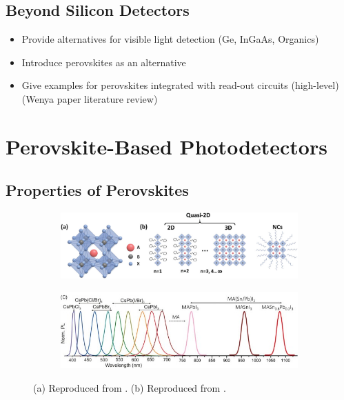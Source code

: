 \subsection{Beyond Silicon Detectors}
\begin{itemize}
    \item Provide alternatives for visible light detection (Ge, InGaAs, Organics)
    \item Introduce perovskites as an alternative
    \item Give examples for perovskites integrated with read-out circuits (high-level) (Wenya paper literature review)
\end{itemize}


\section{Perovskite-Based Photodetectors}

\subsection{Properties of Perovskites}

\begin{figure}[htbp]
    \centering
    \begin{subfigure}[b]{\textwidth}
    \centering
        \includegraphics[width=0.85\linewidth]{chapters/introduction/image/perovskite_structure.jpg}
        \caption{}
        \label{fig:ch1:perovskite structure}
    \end{subfigure}

    \vspace{0.5cm}
    
    \begin{subfigure}[b]{\textwidth}
    \centering
        \includegraphics[width=0.85\linewidth]{chapters/introduction/image/bandgap_tunability.jpg}
        \caption{}
        \label{fig:ch1:bandgap_tunability}
    \end{subfigure}
    
    \caption{(a) Reproduced from \cite{Lei2021MetalApplications}. (b) Reproduced from \cite{Gholipour2020BandgapMaterials}.}
    \label{fig:ch1:perovskite_strucutre_bandgap}
\end{figure}



